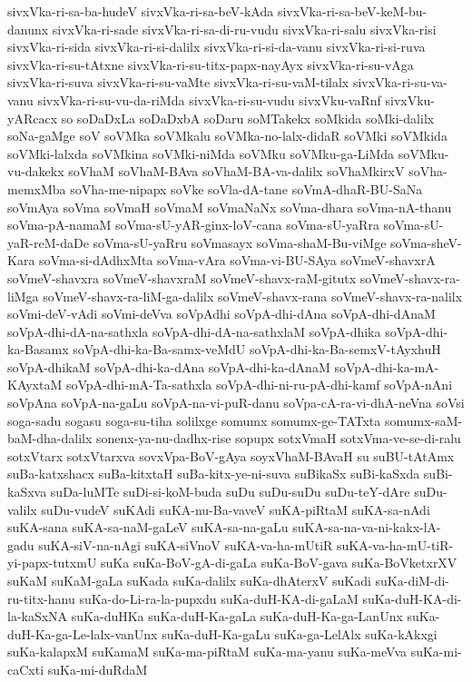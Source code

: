 {sivxVka-ri-sa-ba-hudeV
sivxVka-ri-sa-beV-kAda
sivxVka-ri-sa-beV-keM-bu-danunx
sivxVka-ri-sade
sivxVka-ri-sa-di-ru-vudu
sivxVka-ri-salu
sivxVka-risi
sivxVka-ri-sida
sivxVka-ri-si-dalilx
sivxVka-ri-si-da-vanu
sivxVka-ri-si-ruva
sivxVka-ri-su-tAtxne
sivxVka-ri-su-titx-papx-nayAyx
sivxVka-ri-su-vAga
sivxVka-ri-suva
sivxVka-ri-su-vaMte
sivxVka-ri-su-vaM-tilalx
sivxVka-ri-su-va-vanu
sivxVka-ri-su-vu-da-riMda
sivxVka-ri-su-vudu
sivxVku-vaRnf
sivxVku-yARcacx
so
soDaDxLa
soDaDxbA
soDaru
soMTakekx
soMkida
soMki-dalilx
soNa-gaMge
soV
soVMka
soVMkalu
soVMka-no-lalx-didaR
soVMki
soVMkida
soVMki-lalxda
soVMkina
soVMki-niMda
soVMku
soVMku-ga-LiMda
soVMku-vu-dakekx
soVhaM
soVhaM-BAva
soVhaM-BA-va-dalilx
soVhaMkirxV
soVha-memxMba
soVha-me-nipapx
soVke
soVla-dA-tane
soVmA-dhaR-BU-SaNa
soVmAya
soVma
soVmaH
soVmaM
soVmaNaNx
soVma-dhara
soVma-nA-thanu
soVma-pA-namaM
soVma-sU-yAR-ginx-loV-cana
soVma-sU-yaRra
soVma-sU-yaR-reM-daDe
soVma-sU-yaRru
soVmasayx
soVma-shaM-Bu-viMge
soVma-sheV-Kara
soVma-si-dAdhxMta
soVma-vAra
soVma-vi-BU-SAya
soVmeV-shavxrA
soVmeV-shavxra
soVmeV-shavxraM
soVmeV-shavx-raM-gitutx
soVmeV-shavx-ra-liMga
soVmeV-shavx-ra-liM-ga-dalilx
soVmeV-shavx-rana
soVmeV-shavx-ra-nalilx
soVmi-deV-vAdi
soVmi-deVva
soVpAdhi
soVpA-dhi-dAna
soVpA-dhi-dAnaM
soVpA-dhi-dA-na-sathxla
soVpA-dhi-dA-na-sathxlaM
soVpA-dhika
soVpA-dhi-ka-Basamx
soVpA-dhi-ka-Ba-samx-veMdU
soVpA-dhi-ka-Ba-semxV-tAyxhuH
soVpA-dhikaM
soVpA-dhi-ka-dAna
soVpA-dhi-ka-dAnaM
soVpA-dhi-ka-mA-KAyxtaM
soVpA-dhi-mA-Ta-sathxla
soVpA-dhi-ni-ru-pA-dhi-kamf
soVpA-nAni
soVpAna
soVpA-na-gaLu
soVpA-na-vi-puR-danu
soVpa-cA-ra-vi-dhA-neVna
soVsi
soga-sadu
sogasu
soga-su-tiha
solilxge
somumx
somumx-ge-TATxta
somumx-saM-baM-dha-dalilx
sonenx-ya-nu-dadhx-rise
sopupx
sotxVmaH
sotxVma-ve-se-di-ralu
sotxVtarx
sotxVtarxva
sovxVpa-BoV-gAya
soyxVhaM-BAvaH
su
suBU-tAtAmx
suBa-katxshacx
suBa-kitxtaH
suBa-kitx-ye-ni-suva
suBikaSx
suBi-kaSxda
suBi-kaSxva
suDa-luMTe
suDi-si-koM-buda
suDu
suDu-suDu
suDu-teY-dAre
suDu-valilx
suDu-vudeV
suKAdi
suKA-nu-Ba-vaveV
suKA-piRtaM
suKA-sa-nAdi
suKA-sana
suKA-sa-naM-gaLeV
suKA-sa-na-gaLu
suKA-sa-na-va-ni-kakx-lA-gadu
suKA-siV-na-nAgi
suKA-siVnoV
suKA-va-ha-mUtiR
suKA-va-ha-mU-tiR-yi-papx-tutxmU
suKa
suKa-BoV-gA-di-gaLa
suKa-BoV-gava
suKa-BoVketxrXV
suKaM
suKaM-gaLa
suKada
suKa-dalilx
suKa-dhAterxV
suKadi
suKa-diM-di-ru-titx-hanu
suKa-do-Li-ra-la-pupxdu
suKa-duH-KA-di-gaLaM
suKa-duH-KA-di-la-kaSxNA
suKa-duHKa
suKa-duH-Ka-gaLa
suKa-duH-Ka-ga-LanUnx
suKa-duH-Ka-ga-Le-lalx-vanUnx
suKa-duH-Ka-gaLu
suKa-ga-LelAlx
suKa-kAkxgi
suKa-kalapxM
suKamaM
suKa-ma-piRtaM
suKa-ma-yanu
suKa-meVva
suKa-mi-caCxti
suKa-mi-duRdaM
}
